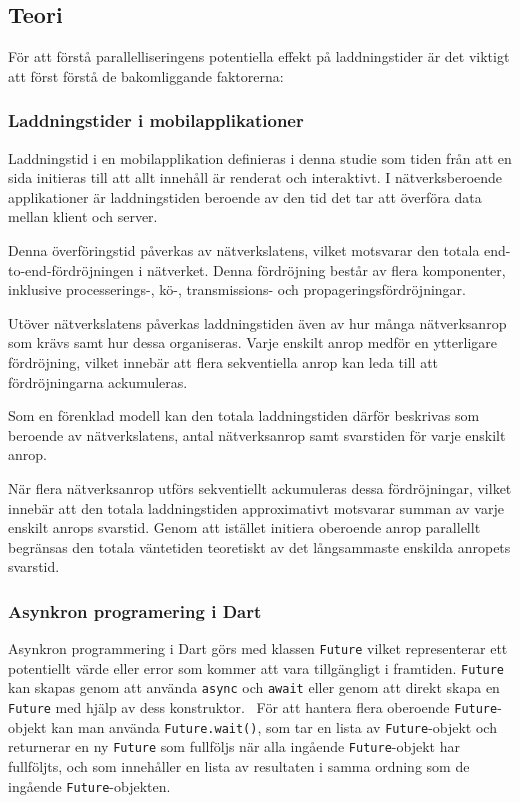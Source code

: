 \documentclass[letterpaper,twocolumn,10pt]{article}
\begin{document}
\subsection{Teori}

För att förstå parallelliseringens potentiella effekt på laddningstider är det
viktigt att först förstå de bakomliggande faktorerna:

\subsubsection{Laddningstider i mobilapplikationer}
Laddningstid i en mobilapplikation definieras i denna studie som tiden från 
att en sida initieras till att allt innehåll är renderat och interaktivt. 
I nätverksberoende applikationer är laddningstiden beroende av den tid det 
tar att överföra data mellan klient och server.

Denna överföringstid påverkas av nätverkslatens, vilket
motsvarar den totala end-to-end-fördröjningen i nätverket. Denna fördröjning 
består av flera komponenter, inklusive processerings-, kö-, transmissions- 
och propageringsfördröjningar.~\cite{kurose2021} 

Utöver nätverkslatens påverkas laddningstiden även av hur många nätverksanrop som 
krävs samt hur dessa organiseras. Varje enskilt anrop medför en ytterligare 
fördröjning, vilket innebär att flera sekventiella anrop kan leda till att 
fördröjningarna ackumuleras.

Som en förenklad modell kan den totala laddningstiden därför beskrivas som 
beroende av nätverkslatens, antal nätverksanrop samt svarstiden för varje 
enskilt anrop.

När flera nätverksanrop utförs sekventiellt ackumuleras dessa fördröjningar, 
vilket innebär att den totala laddningstiden approximativt motsvarar summan 
av varje enskilt anrops svarstid. Genom att istället initiera oberoende anrop 
parallellt begränsas den totala väntetiden teoretiskt av det långsammaste 
enskilda anropets svarstid.
\subsubsection{Asynkron programering i Dart}
\label{sec:Future_wait}


Asynkron programmering i Dart görs med klassen \texttt{Future} vilket
representerar ett potentiellt värde eller error som kommer att vara tillgängligt
i framtiden. \texttt{Future} kan skapas genom att använda \texttt{async} och \texttt{await} eller genom att direkt skapa en \texttt{Future} med hjälp av dess konstruktor.~\cite{dart_async} För att hantera flera oberoende \texttt{Future}-objekt kan man använda \texttt{Future.wait()}, som tar en lista av \texttt{Future}-objekt och returnerar en ny \texttt{Future} som fullföljs när alla ingående \texttt{Future}-objekt har fullföljts, och som innehåller en lista av resultaten i samma ordning som de ingående \texttt{Future}-objekten.~\cite{dart_future_wait}
\end{document}
